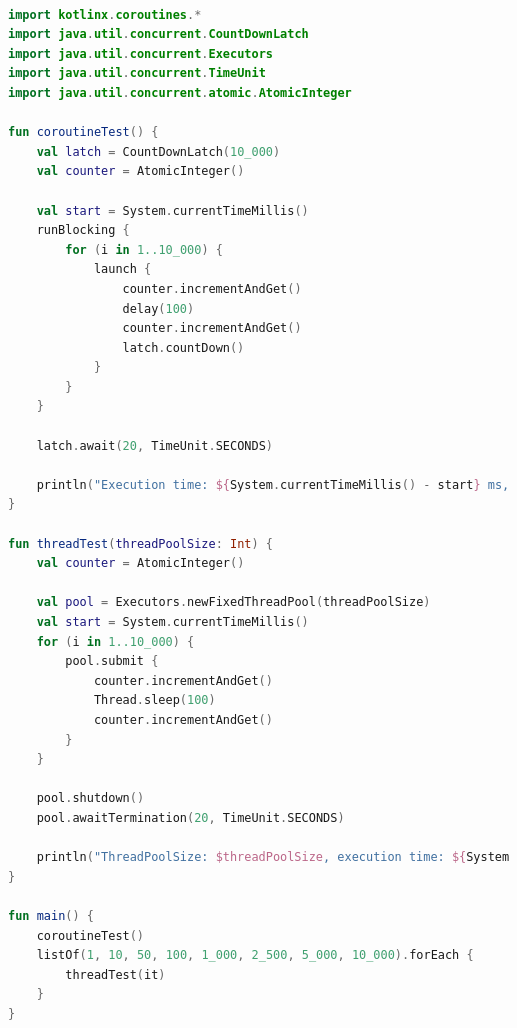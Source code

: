 \documentclass[11pt]{article}
\begin{document}
    \begin{lstlisting}[language=Kotlin, caption={Coroutines.kt}, label={lst:kotlin-coroutine}]

import kotlinx.coroutines.*
import java.util.concurrent.CountDownLatch
import java.util.concurrent.Executors
import java.util.concurrent.TimeUnit
import java.util.concurrent.atomic.AtomicInteger

fun coroutineTest() {
    val latch = CountDownLatch(10_000)
    val counter = AtomicInteger()

    val start = System.currentTimeMillis()
    runBlocking {
        for (i in 1..10_000) {
            launch {
                counter.incrementAndGet()
                delay(100)
                counter.incrementAndGet()
                latch.countDown()
            }
        }
    }

    latch.await(20, TimeUnit.SECONDS)

    println("Execution time: ${System.currentTimeMillis() - start} ms, Counter: ${counter.get()/2}")
}

fun threadTest(threadPoolSize: Int) {
    val counter = AtomicInteger()

    val pool = Executors.newFixedThreadPool(threadPoolSize)
    val start = System.currentTimeMillis()
    for (i in 1..10_000) {
        pool.submit {
            counter.incrementAndGet()
            Thread.sleep(100)
            counter.incrementAndGet()
        }
    }

    pool.shutdown()
    pool.awaitTermination(20, TimeUnit.SECONDS)

    println("ThreadPoolSize: $threadPoolSize, execution time: ${System.currentTimeMillis() - start} ms, Counter: ${counter.get()/2}")
}

fun main() {
    coroutineTest()
    listOf(1, 10, 50, 100, 1_000, 2_500, 5_000, 10_000).forEach {
        threadTest(it)
    }
}
    \end{lstlisting}
\end{document}
